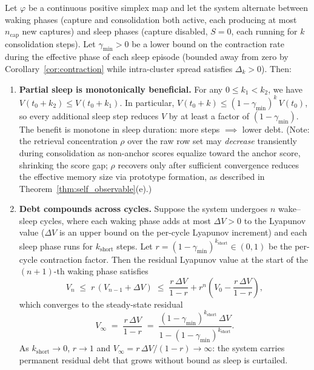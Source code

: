 \begin{theorem}
\label{thm:sleep_debt}
\leanok
{}
Let $\varphi$ be a continuous positive simplex map and let the system alternate between waking phases (capture and consolidation both active, each producing at most $n_{\mathrm{cap}}$ new captures) and sleep phases (capture disabled, $S = 0$, each running for $k$ consolidation steps).  Let $\gamma_{\min} > 0$ be a lower bound on the contraction rate during the effective phase of each sleep episode (bounded away from zero by Corollary~\ref{cor:contraction} while intra-cluster spread satisfies $\Delta_k > 0$).  Then:
\begin{enumerate}

\item \textbf{Partial sleep is monotonically beneficial.}  For any $0 \leq k_1 < k_2$, we have $V(t_0 + k_2) \leq V(t_0 + k_1)$.  In particular, $V(t_0 + k) \leq (1 - \gamma_{\min})^{k}\,V(t_0)$, so every additional sleep step reduces $V$ by at least a factor of $(1 - \gamma_{\min})$.  The benefit is monotone in sleep duration: more steps $\implies$ lower debt.  (Note: the retrieval concentration $\rho$ over the raw row set may \emph{decrease} transiently during consolidation as non-anchor scores equalize toward the anchor score, shrinking the score gap; $\rho$ recovers only after sufficient convergence reduces the effective memory size via prototype formation, as described in Theorem~\ref{thm:self_observable}(e).)

\item \textbf{Debt compounds across cycles.}  Suppose the system undergoes $n$ wake--sleep cycles, where each waking phase adds at most $\Delta V > 0$ to the Lyapunov value ($\Delta V$ is an upper bound on the per-cycle Lyapunov increment) and each sleep phase runs for $k_{\mathrm{short}}$ steps.  Let $r = (1 - \gamma_{\min})^{k_{\mathrm{short}}} \in (0,1)$ be the per-cycle contraction factor.  Then the residual Lyapunov value at the start of the $(n+1)$-th waking phase satisfies
\[
V_n \;\leq\; r\,(V_{n-1} + \Delta V) \;\leq\; \frac{r\,\Delta V}{1 - r} + r^n\!\left(V_0 - \frac{r\,\Delta V}{1 - r}\right),
\]
which converges to the steady-state residual
\[
V_{\infty} \;=\; \frac{r\,\Delta V}{1 - r} \;=\; \frac{(1 - \gamma_{\min})^{k_{\mathrm{short}}}\,\Delta V}{1 - (1 - \gamma_{\min})^{k_{\mathrm{short}}}}.
\]
As $k_{\mathrm{short}} \to 0$, $r \to 1$ and $V_{\infty} = r\,\Delta V/(1-r) \to \infty$: the system carries permanent residual debt that grows without bound as sleep is curtailed.


\end{enumerate}
\end{theorem}
